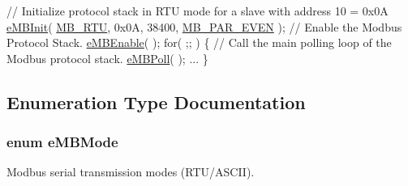 \begin{DoxyCode}
\textcolor{comment}{// Initialize protocol stack in RTU mode for a slave with address 10 = 0x0A}
\hyperlink{group__modbus_ga622dbe6b38ff1d255523d4736fa3da26}{eMBInit}( \hyperlink{group__modbus_gga462d0d9396f02be6f9fd5b6f19463e61a1b807b8cf3d593d8cd8d1a1d21a3da31}{MB\_RTU}, 0x0A, 38400, \hyperlink{group__modbus_gga16ba85fa56bcd52a11a12576af445ccba0415f4c7ede57e13a0cca698a8375dbd}{MB\_PAR\_EVEN} );
\textcolor{comment}{// Enable the Modbus Protocol Stack.}
\hyperlink{group__modbus_gab697be370833d562e6b016626d996132}{eMBEnable}(  );
\textcolor{keywordflow}{for}( ;; )
\{
    \textcolor{comment}{// Call the main polling loop of the Modbus protocol stack.}
    \hyperlink{group__modbus_ga12648c98d45f768ba878fbcee46caca5}{eMBPoll}(  );
    ...
\}
\end{DoxyCode}
 

\subsection{Enumeration Type Documentation}
\subsubsection[{\texorpdfstring{e\+M\+B\+Mode}{eMBMode}}]{\setlength{\rightskip}{0pt plus 5cm}enum {\bf e\+M\+B\+Mode}}\hypertarget{group__modbus_ga462d0d9396f02be6f9fd5b6f19463e61}{}\label{group__modbus_ga462d0d9396f02be6f9fd5b6f19463e61}


Modbus serial transmission modes (R\+T\+U/\+A\+S\+C\+II). 

